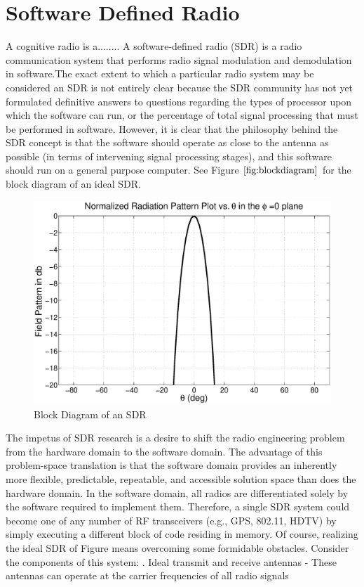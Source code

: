 \documentclass[a4paper,10pt]{article}
\begin{document}
\section{Software Defined Radio}
A cognitive radio is a........ A software-defined radio (SDR) is a
radio communication system that performs radio signal modulation and
demodulation in software.The exact extent to which a particular
radio system may be considered an SDR is not entirely clear because
the SDR community has not yet formulated definitive answers to
questions regarding the types of processor upon which the software
can run, or the percentage of total signal processing that must be
performed in software. However, it is clear that the philosophy
behind the SDR concept is that the software should operate as close
to the antenna as possible (in terms of intervening signal
processing stages), and this software should run on a general
purpose computer. See Figure $\ref{fig:blockdiagram}$ for the block
diagram of an ideal SDR.
\begin{figure}
\centering
\includegraphics[width=0.5 \textwidth]{Broadside}
\caption{Block Diagram of an SDR} \label{fig:blockdiagram}
\end{figure}
The impetus of SDR research is a desire to shift the radio
engineering problem from the hardware domain to the software domain.
The advantage of this problem-space translation is that the software
domain provides an inherently more flexible, predictable,
repeatable, and accessible solution space than does the hardware
domain. In the software domain, all radios are differentiated solely
by the software required to implement them. Therefore, a single SDR
system could become one of any number of RF transceivers (e.g., GPS,
802.11, HDTV) by simply executing a different block of code residing
in memory. Of course, realizing the ideal SDR of Figure means
overcoming some formidable obstacles. Consider the components of
this system: . Ideal transmit and receive antennas - These
antennas can operate at the carrier frequencies of all radio signals
\end{document}
